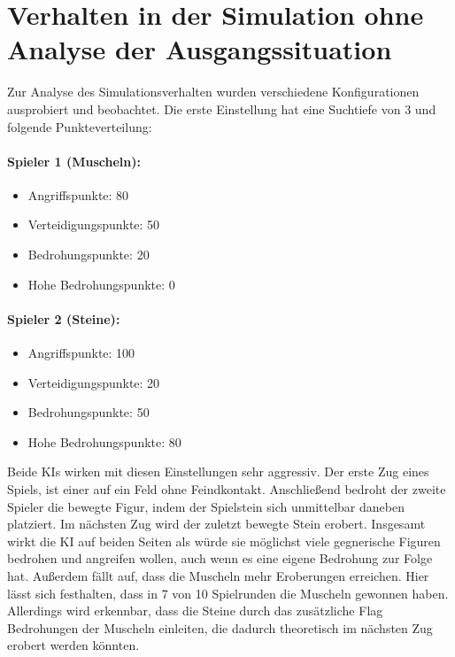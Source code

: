\section{Verhalten in der Simulation ohne Analyse der Ausgangssituation}
\label{ch:Evaluierung:sec:Simulation}
Zur Analyse des Simulationsverhalten wurden verschiedene Konfigurationen ausprobiert und beobachtet. Die erste Einstellung hat eine Suchtiefe von 3 und folgende Punkteverteilung: \\
\paragraph{Spieler 1 (Muscheln):}
\begin{itemize}
	\item Angriffspunkte: 80
	\item Verteidigungspunkte: 50
	\item Bedrohungspunkte: 20
	\item Hohe Bedrohungspunkte: 0
\end{itemize}

\paragraph{Spieler 2 (Steine):}
\begin{itemize}
	\item Angriffspunkte: 100
	\item Verteidigungspunkte: 20
	\item Bedrohungspunkte: 50
	\item Hohe Bedrohungspunkte: 80
\end{itemize}
Beide KIs wirken mit diesen Einstellungen sehr aggressiv. Der erste Zug eines Spiels, ist einer auf ein Feld ohne Feindkontakt. Anschließend bedroht der zweite Spieler die bewegte Figur, indem der Spielstein sich unmittelbar daneben platziert. Im nächsten Zug wird der zuletzt bewegte Stein erobert. Insgesamt wirkt die KI auf beiden Seiten als würde sie möglichst viele gegnerische Figuren bedrohen und angreifen wollen, auch wenn es eine eigene Bedrohung zur Folge hat. Außerdem fällt auf, dass die Muscheln mehr Eroberungen erreichen. Hier lässt sich festhalten, dass in 7 von 10 Spielrunden die Muscheln gewonnen haben. Allerdings wird erkennbar, dass die Steine durch das zusätzliche Flag Bedrohungen der Muscheln einleiten, die dadurch theoretisch im nächsten Zug erobert werden könnten.
